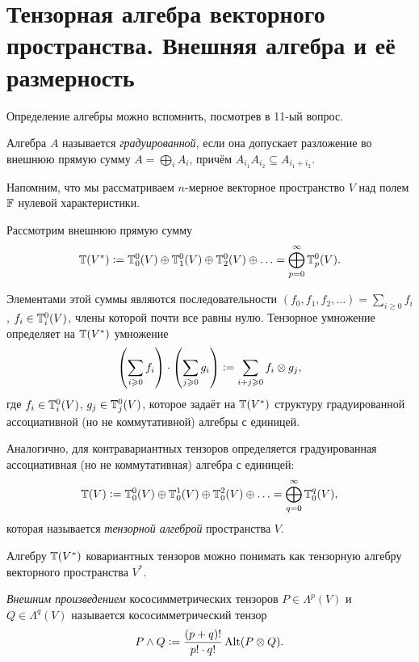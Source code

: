 \section{Тензорная алгебра векторного пространства. Внешняя алгебра и её размерность}

Определение алгебры можно вспомнить, посмотрев в 11-ый вопрос.

\begin{definition}
    Алгебра $A$ называется \textit{градуированной}, если она допускает разложение во внешнюю прямую сумму $A = \bigoplus\limits_iA_i$, причём $A_{i_1}A_{i_2} \subseteq A_{i_1 + i_2}$.
\end{definition}

Напомним, что мы рассматриваем $n$-мерное векторное пространство $V$ над полем $\mathbb{F}$ нулевой характеристики.

Рассмотрим внешнюю прямую сумму
\[
    \mathbb{T}(V^\ast) \vcentcolon = \mathbb{T}_0^0(V) \oplus \mathbb{T}_1^0(V) \oplus \mathbb{T}_2^0(V) \oplus \ldots = \bigoplus_{p = 0}^\infty\mathbb{T}_p^0(V).
\]

Элементами этой суммы являются последовательности $(f_0, f_1, f_2, \ldots) = \sum\limits_{i \geqslant 0}f_i$, $f_i \in \mathbb{T}_i^0(V)$, члены которой почти все равны нулю. Тензорное умножение определяет на $\mathbb{T}(V^\ast)$ умножение
\[
    \left(\sum_{i \geqslant 0}f_i\right) \cdot \left(\sum_{j \geqslant 0}g_i\right) \vcentcolon = \sum_{i + j \geqslant 0}f_i \otimes g_j,
\]
где $f_i \in \mathbb{T}_i^0(V)$, $g_j \in \mathbb{T}_j^0(V)$, которое задаёт на $\mathbb{T}(V^\ast)$ структуру градуированной ассоциативной (но не коммутативной) алгебры с единицей.

\begin{definition}
    Аналогично, для контравариантных тензоров определяется градуированная ассоциативная (но не коммутативная) алгебра с единицей:
    \[
        \mathbb{T}(V) \vcentcolon = \mathbb{T}_0^0(V) \oplus \mathbb{T}_0^1(V) \oplus \mathbb{T}_0^2(V) \oplus \ldots = \bigoplus_{q = 0}^\infty\mathbb{T}_0^q(V),
    \]
    которая называется \textit{тензорной алгеброй} пространства $V$.
\end{definition}

Алгебру $\mathbb{T}(V^\ast)$ ковариантных тензоров можно понимать как тензорную алгебру векторного пространства $V^\ast$.

\begin{definition}
    \textit{Внешним произведением} кососимметрических тензоров $P \in \Lambda^p(V)$ и $Q \in \Lambda^q(V)$ называется кососимметрический тензор
    \[
        P \wedge Q \vcentcolon = \frac{(p + q)!}{p! \cdot q!}\operatorname{Alt}(P \otimes Q).
    \]
\end{definition}

